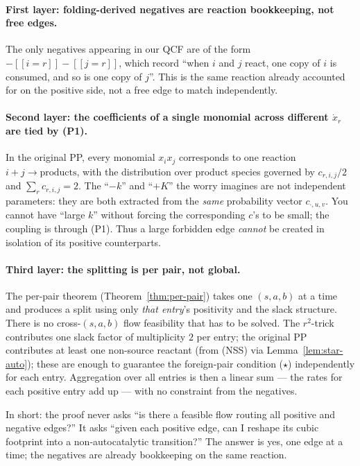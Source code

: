 \documentclass[11pt]{article}
\newcommand{\iv}[1]{[\![#1]\!]}
\begin{document}
\paragraph{First layer: folding-derived negatives are reaction bookkeeping,
not free edges.} The only negatives appearing in our QCF are of the
form $-\iv{i=r} - \iv{j=r}$, which record ``when $i$ and $j$ react, one
copy of $i$ is consumed, and so is one copy of $j$''. This is the same
reaction already accounted for on the positive side, not a free edge
to match independently.

\paragraph{Second layer: the coefficients of a single monomial across
different $\dot x_r$ are tied by (P1).} In the original PP, every
monomial $x_i x_j$ corresponds to one reaction $i + j \to \text{products}$,
with the distribution over product species governed by
$c_{r,i,j}/2$ and $\sum_r c_{r,i,j} = 2$. The ``$-k$'' and ``$+K$'' the
worry imagines are not independent parameters: they are both extracted
from the \emph{same} probability vector $c_{\cdot, u, v}$. You cannot
have ``large $k$'' without forcing the corresponding $c$'s to be
small; the coupling is through (P1). Thus a large forbidden edge
\emph{cannot} be created in isolation of its positive counterparts.

\paragraph{Third layer: the splitting is per pair, not global.}
The per-pair theorem (Theorem~\ref{thm:per-pair}) takes one $(s,a,b)$
at a time and produces a split using only \emph{that entry}'s
positivity and the slack structure. There is no cross-$(s,a,b)$ flow
feasibility that has to be solved. The $r^2$-trick contributes one
slack factor of multiplicity $2$ per entry; the original PP
contributes at least one non-source reactant (from (NSS) via
Lemma~\ref{lem:star-auto}); these are enough to guarantee the
foreign-pair condition ($\star$) independently for each entry.
Aggregation over all entries is then a linear sum --- the rates for
each positive entry add up --- with no constraint from the negatives.

\medskip

In short: the proof never asks ``is there a feasible flow routing all
positive and negative edges?'' It asks ``given each positive edge, can
I reshape its cubic footprint into a non-autocatalytic transition?''
The answer is yes, one edge at a time; the negatives are already
bookkeeping on the same reaction.
\end{document}
